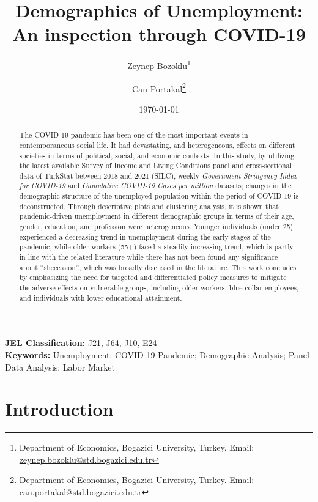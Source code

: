 \documentclass[a4paper,12pt]{article}
\title{Demographics of Unemployment: An inspection through COVID-19}
\author{
    Zeynep Bozoklu\thanks{\parbox[t]{0.75\textwidth}{Department of Economics, Bogazici University, Turkey. Email: \href{mailto:zeynep.bozoklu@std.bogazici.edu.tr}{zeynep.bozoklu@std.bogazici.edu.tr}}} 
    \and 
    Can Portakal\thanks{\parbox[t]{0.75\textwidth}{Department of Economics, Bogazici University, Turkey. Email: \href{mailto:can.portakal@std.bogazici.edu.tr}{can.portakal@std.bogazici.edu.tr}}}
}
\date{\today}
\begin{document}
\setlength{\parindent}{1.5em} %

\maketitle


\begin{abstract}
    \noindent The COVID-19 pandemic has been one of the most important events in contemporaneous social life. It had devastating, and heterogeneous, effects on different societies in terms of political, social, and economic contexts. In this study, by utilizing the latest available Survey of Income and Living Conditions panel and cross-sectional data of TurkStat between 2018 and 2021 (SILC), weekly \textit{Government Stringency Index for COVID-19} and \textit{Cumulative COVID-19 Cases per million} datasets; changes in the demographic structure of the unemployed population within the period of COVID-19 is deconstructed. Through descriptive plots and clustering analysis, it is shown that pandemic-driven unemployment in different demographic groups in terms of their age, gender, education, and profession were heterogeneous. Younger individuals (under 25) experienced a decreasing trend in unemployment during the early stages of the pandemic, while older workers (55+) faced a steadily increasing trend, which is partly in line with the related literature while there has not been found any significance about “shecession”, which was broadly discussed in the literature. This work concludes by emphasizing the need for targeted and differentiated policy measures to mitigate the adverse effects on vulnerable groups, including older workers, blue-collar employees, and individuals with lower educational attainment.

\end{abstract}

\noindent\textbf{JEL Classification:} J21, J64, J10, E24 \\

\noindent\textbf{Keywords:} Unemployment; COVID-19 Pandemic; Demographic Analysis; Panel Data Analysis; Labor Market

\section{Introduction}
\end{document}
